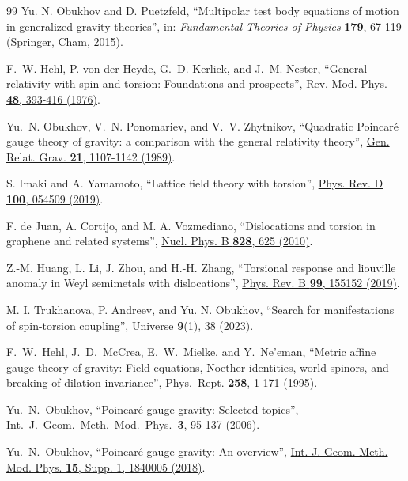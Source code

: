 \documentclass[12pt,prd,showkeys,amsmath,amssymb,nofootinbib]{revtex4-1}
\begin{document}
\begin{thebibliography}{99}
Yu. N. Obukhov and D. Puetzfeld, ``Multipolar test body equations of motion in generalized
gravity theories'', in: {\it Fundamental Theories of Physics} {\bf 179}, 67-119
\href{https://doi.org/10.1007/978-3-319-18335-0_2}{(Springer, Cham, 2015)}.

F.~W. Hehl, P. von der Heyde, G.~D. Kerlick, and J.~M. Nester,
``General relativity with spin and torsion: Foundations and prospects'',
\href{https://doi.org/10.1103/RevModPhys.48.393}{Rev. Mod. Phys. {\bf 48}, 393-416 (1976)}.

Yu.~N. Obukhov, V.~N. Ponomariev, and V.~V. Zhytnikov, ``Quadratic Poincar\'e gauge theory of gravity:
a comparison with the general relativity theory'',
\href{http://dx.doi.org/10.1007/BF00763457}{Gen. Relat. Grav. {\bf 21}, 1107-1142 (1989)}.

S. Imaki and A. Yamamoto, ``Lattice field theory with torsion'',
\href{https://doi.org/10.1103/PhysRevD.100.054509}{Phys. Rev. D {\bf 100}, 054509 (2019)}.

F. de Juan, A. Cortijo, and M. A. Vozmediano, ``Dislocations and torsion in graphene and related systems'',
\href{https://doi.org/https://doi.org/10.1016/j.nuclphysb.2009.11.012}{Nucl. Phys. B {\bf 828}, 625 (2010)}. 
  
Z.-M. Huang, L. Li, J. Zhou, and H.-H. Zhang,
``Torsional response and liouville anomaly in Weyl semimetals with dislocations'',
\href{https://doi.org/10.1103/PhysRevB.99.155152}{Phys. Rev. B {\bf 99}, 155152 (2019)}.

M. I. Trukhanova, P. Andreev, and Yu. N. Obukhov, ``Search for manifestations of spin-torsion coupling'',
\href{https://doi.org/10.3390/universe9010038}{Universe {\bf 9}(1), 38 (2023)}. 

F.~W.~Hehl, J.~D.~McCrea, E.~W.~Mielke, and Y.~Ne'eman, ``Metric affine gauge theory of gravity:
Field equations, Noether identities, world spinors, and breaking of dilation invariance'',
\href{https://doi.org/10.1016/0370-1573(94)00111-F}{Phys.\ Rept. {\bf 258}, 1-171 (1995).} 

Yu.~N.~Obukhov, ``Poincar\'e gauge gravity: Selected topics'',
\href{http://dx.doi.org/10.1142/S021988780600103X}{Int.\ J.\ Geom.\ Meth.\ Mod.\ Phys.\ {\bf 3}, 95-137 (2006)}. 

Yu.~N.~Obukhov, ``Poincar\'e gauge gravity: An overview'',
\href{https://doi.org/10.1142/S0219887818400054}{Int. J. Geom. Meth. Mod. Phys. {\bf 15}, Supp. 1, 1840005 (2018)}. 


\end{thebibliography}
\end{document}
